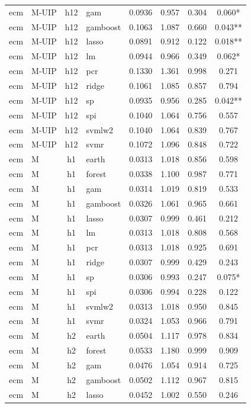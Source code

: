 \begin{ThreePartTable}
\begin{longtable}[t]{llclcccc}
ecm & M-UIP & h12 & gam & 0.0936 & 0.957 & 0.304 & 0.060*\\
ecm & M-UIP & h12 & gamboost & 0.1063 & 1.087 & 0.660 & 0.043**\\
ecm & M-UIP & h12 & lasso & 0.0891 & 0.912 & 0.122 & 0.018**\\
ecm & M-UIP & h12 & lm & 0.0944 & 0.966 & 0.349 & 0.062*\\
ecm & M-UIP & h12 & pcr & 0.1330 & 1.361 & 0.998 & 0.271\\
ecm & M-UIP & h12 & ridge & 0.1061 & 1.085 & 0.857 & 0.794\\
ecm & M-UIP & h12 & sp & 0.0935 & 0.956 & 0.285 & 0.042**\\
ecm & M-UIP & h12 & spi & 0.1040 & 1.064 & 0.756 & 0.557\\
ecm & M-UIP & h12 & svmlw2 & 0.1040 & 1.064 & 0.839 & 0.767\\
ecm & M-UIP & h12 & svmr & 0.1072 & 1.096 & 0.848 & 0.722\\
\addlinespace
ecm & M & h1 & earth & 0.0313 & 1.018 & 0.856 & 0.598\\
ecm & M & h1 & forest & 0.0338 & 1.100 & 0.987 & 0.771\\
ecm & M & h1 & gam & 0.0314 & 1.019 & 0.819 & 0.533\\
ecm & M & h1 & gamboost & 0.0326 & 1.061 & 0.965 & 0.661\\
ecm & M & h1 & lasso & 0.0307 & 0.999 & 0.461 & 0.212\\
ecm & M & h1 & lm & 0.0313 & 1.018 & 0.808 & 0.568\\
ecm & M & h1 & pcr & 0.0313 & 1.018 & 0.925 & 0.691\\
ecm & M & h1 & ridge & 0.0307 & 0.999 & 0.429 & 0.243\\
ecm & M & h1 & sp & 0.0306 & 0.993 & 0.247 & 0.075*\\
ecm & M & h1 & spi & 0.0306 & 0.994 & 0.228 & 0.122\\
ecm & M & h1 & svmlw2 & 0.0313 & 1.018 & 0.950 & 0.845\\
ecm & M & h1 & svmr & 0.0324 & 1.053 & 0.966 & 0.791\\
\addlinespace
ecm & M & h2 & earth & 0.0504 & 1.117 & 0.978 & 0.834\\
ecm & M & h2 & forest & 0.0533 & 1.180 & 0.999 & 0.909\\
ecm & M & h2 & gam & 0.0476 & 1.054 & 0.914 & 0.725\\
ecm & M & h2 & gamboost & 0.0502 & 1.112 & 0.967 & 0.815\\
ecm & M & h2 & lasso & 0.0452 & 1.002 & 0.550 & 0.246\\

\end{longtable}
\end{ThreePartTable}
